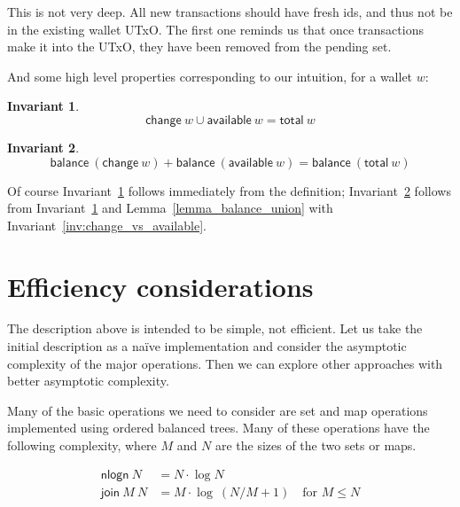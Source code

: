 \documentclass{article}
\newtheorem{invariant}{Invariant}
\begin{document}
This is not very deep. All new transactions should have fresh ids, and thus
not be in the existing wallet UTxO. The first one reminds us that once
transactions make it into the UTxO, they have been removed from the pending set.

And some high level properties corresponding to our intuition, for a wallet $w$:

\begin{invariant}
\begin{equation*}
\mathsf{change} ~ w \cup \mathsf{available} ~ w = \mathsf{total} ~ w
\end{equation*}
\label{inv:change_union_available}
\end{invariant}

\begin{invariant}
\begin{equation*}
\mathsf{balance} ~ (\mathsf{change} ~ w) + \mathsf{balance} ~ (\mathsf{available} ~ w) = \mathsf{balance} ~ (\mathsf{total} ~ w)
\end{equation*}
\label{inv:balance_change_available}
\end{invariant}

Of course Invariant~\ref{inv:change_union_available} follows immediately from
the definition; Invariant~\ref{inv:balance_change_available} follows from
Invariant~\ref{inv:change_union_available} and Lemma~\ref{lemma_balance_union}
with Invariant~\ref{inv:change_vs_available}.

\section{Efficiency considerations}

The description above is intended to be simple, not efficient. Let us take the
initial description as a na\"ive implementation and consider the asymptotic
complexity of the major operations. Then we can explore other approaches with
better asymptotic complexity.

Many of the basic operations we need to consider are set and map operations
implemented using ordered balanced trees. Many of these operations have the
following complexity, where $M$ and $N$ are the sizes of the two sets or maps.

\begin{equation*}
\begin{split}
\mathsf{nlogn} ~ N & = N \cdot \log N \\
\mathsf{join} ~ M ~ N & = M \cdot \log ~ (N/M + 1) \quad \text{for } M \leq N
\end{split}
\end{equation*}
\end{document}
